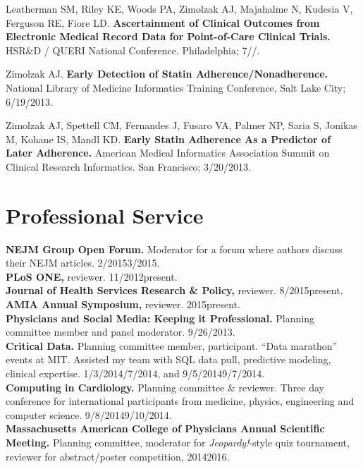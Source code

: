 \documentclass[10pt]{article}
\begin{document}
Leatherman SM, Riley KE, Woods PA, Zimolzak AJ, Majahalme N, Kudesia
V, Ferguson RE, Fiore LD. \textbf{Ascertainment of Clinical Outcomes
  from Electronic Medical Record Data for Point-of-Care Clinical
  Trials.} HSR\&D / QUERI National Conference. Philadelphia;
7/\ndash{}/.

Zimolzak AJ. \textbf{Early Detection of Statin
  Adherence/Nonadherence.} National Library of Medicine Informatics
Training Conference, Salt Lake City; 6/19/2013.

Zimolzak AJ, Spettell CM, Fernandes J, Fusaro VA, Palmer NP, Saria S,
Jonikas M, Kohane IS, Mandl KD. \textbf{Early Statin Adherence As a
  Predictor of Later Adherence.} American Medical Informatics
Association Summit on Clinical Research Informatics. San Francisco;
3/20/2013.

\section*{Professional Service}

\textbf{NEJM Group Open Forum.} Moderator for a forum where
authors discuss their NEJM articles. 2/2015\ndash{}3/2015.\\
\textbf{PLoS ONE,} reviewer. 11/2012\ndash{}present.\\
\textbf{Journal of Health Services Research \& Policy,} reviewer.
8/2015\ndash{}present.\\
\textbf{AMIA Annual Symposium,} reviewer. 2015\ndash{}present.\\
\textbf{Physicians and Social Media: Keeping it Professional.}
Planning committee member and panel moderator. 9/26/2013.\\
\textbf{Critical Data.} Planning committee member, participant. “Data
marathon” events at MIT. Assisted my team with SQL data pull,
predictive modeling, clinical expertise.
1/3/2014\ndash{}/7/2014, and 9/5/2014\ndash{}9/7/2014.\\
\textbf{Computing in Cardiology.} Planning committee \& reviewer. Three day conference for international
participants from medicine, physics, engineering and computer science.
9/8/2014\ndash{}9/10/2014.\\
\textbf{Massachusetts American College of Physicians Annual Scientific
  Meeting.} Planning committee, moderator for \emph{Jeopardy!}-style
quiz tournament, reviewer for abstract/poster competition,
2014\ndash{}2016.
\end{document}
